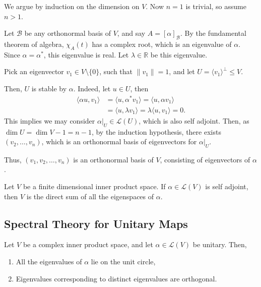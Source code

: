\documentclass[12pt]{article}
\begin{document}
\begin{proofbox}
	We argue by induction on the dimension on $V$. Now $n = 1$ is trivial, so assume $n > 1$.

	Let $\mathcal{B}$ be any orthonormal basis of $V$, and say $A = [\alpha]_{\mathcal{B}}$. By the fundamental theorem of algebra, $\chi_A(t)$ has a complex root, which is an eigenvalue of $\alpha$. Since $\alpha = \alpha^{\ast}$, this eigenvalue is real. Let $\lambda \in \mathbb{R}$ be this eigenvalue.

	Pick an eigenvector $v_1 \in V \setminus \{0\}$, such that $\|v_1\| = 1$, and let $U = \langle v_1 \rangle^{\perp} \leq V$.

	Then, $U$ is stable by $\alpha$. Indeed, let $u \in U$, then
	\begin{align*}
		\langle \alpha u, v_1 \rangle &= \langle u, \alpha^{\ast} v_1 \rangle = \langle u, \alpha v_1 \rangle \\
					      &= \langle u, \lambda v_1 \rangle = \lambda \langle u, v_1 \rangle = 0.
	\end{align*}
	This implies we may consider $\alpha|_U \in \mathcal{L}(U)$, which is also self adjoint. Then, as $\dim U = \dim V - 1 = n - 1$, by the induction hypothesis, there exists $(v_2, \ldots, v_n)$, which is an orthonormal basis of eigenvectors for $\alpha|_U$.

	Thus, $(v_1, v_2, \ldots, v_n)$ is an orthonormal basis of $V$, consisting of eigenvectors of $\alpha$.
\end{proofbox}

\begin{corollary}
	Let $V$ be a finite dimensional inner product space. If $\alpha \in \mathcal{L}(V)$ is self adjoint, then $V$ is the direct sum of all the eigenspaces of $\alpha$.
\end{corollary}

\subsection{Spectral Theory for Unitary Maps}
\label{sub:spectral_theoery_for_unitary_maps}

\begin{lemma}
	Let $V$ be a complex inner product space, and let $\alpha \in \mathcal{L}(V)$ be unitary. Then,
	\begin{enumerate}[\normalfont(i)]
		\item All the eigenvalues of $\alpha$ lie on the unit circle,
		\item Eigenvalues corresponding to distinct eigenvalues are orthogonal.
	\end{enumerate}
\end{lemma}
\end{document}
